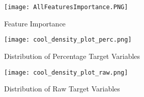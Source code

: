 \documentclass[12pt]{article}
\begin{document}
\begin{figure}[!htb]
  \centering
  \texttt{[image: AllFeaturesImportance.PNG]}
  \caption{Feature Importance}
  \label{fig:target_perc}
\end{figure}

\begin{figure}[!htb]
  \centering
  \texttt{[image: cool\_density\_plot\_perc.png]}
  \caption{Distribution of Percentage Target Variables}
  \label{fig:target_perc}
\end{figure}

\begin{figure}[!htb]
  \centering
  \texttt{[image: cool\_density\_plot\_raw.png]}
  \caption{Distribution of Raw Target Variables}
  \label{fig:target_raw}
\end{figure}




\printbibliography
%   


\end{document}
